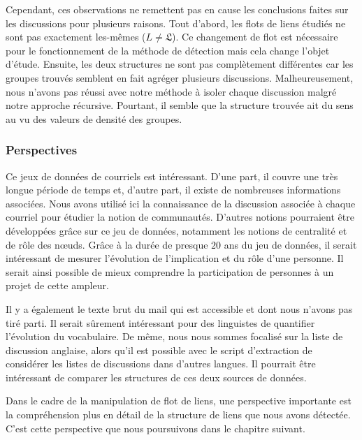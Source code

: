 Cependant, ces observations ne remettent pas en cause les conclusions faites sur les discussions pour plusieurs raisons.
Tout d'abord, les flots de liens étudiés ne sont pas exactement les-mêmes ($L\neq \mathfrak{L}$).
Ce changement de flot est nécessaire pour le fonctionnement de la méthode de détection mais cela change l'objet d'étude.
Ensuite, les deux structures ne sont pas complètement différentes car les groupes trouvés semblent en fait agréger plusieurs discussions.
Malheureusement, nous n'avons pas réussi avec notre méthode à isoler chaque discussion malgré notre approche récursive.
Pourtant, il semble que la structure trouvée ait du sens au vu des valeurs de densité des groupes.

\subsubsection{Perspectives}

Ce jeux de données de courriels est intéressant.
D'une part, il couvre une très longue période de temps et, d'autre part, il existe de nombreuses informations associées.
Nous avons utilisé ici la connaissance de la discussion associée à chaque courriel pour étudier la notion de communautés.
D'autres notions pourraient être développées grâce sur ce jeu de données, notamment les notions de centralité et de rôle des n\oe{}uds.
Grâce à la durée de presque $20$ ans du jeu de données, il serait intéressant de mesurer l'évolution de l'implication et du rôle d'une personne.
Il serait ainsi possible de mieux comprendre la participation de personnes à un projet de cette ampleur.

Il y a également le texte brut du mail qui est accessible et dont nous n'avons pas tiré parti.
Il serait sûrement intéressant pour des linguistes de quantifier l'évolution du vocabulaire.
De même, nous nous sommes focalisé sur la liste de discussion anglaise, alors qu'il est possible avec le script d'extraction de considérer les listes de discussions dans d'autres langues.
Il pourrait être intéressant de comparer les structures de ces deux sources de données.

\bigskip

Dans le cadre de la manipulation de flot de liens, une perspective importante est la compréhension plus en détail de la structure de liens que nous avons détectée.
C'est cette perspective que nous poursuivons dans le chapitre suivant.

